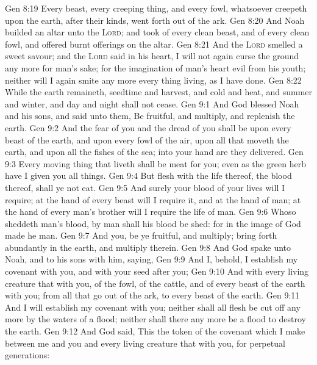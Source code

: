 \vs Gen 8:19 Every beast, every creeping thing, and every fowl,  whatsoever creepeth upon the earth, after their kinds, went forth out of the ark.
\vs Gen 8:20 And Noah builded an altar unto the \textsc{Lord}; and took of every clean beast, and of every clean fowl, and offered burnt offerings on the altar.
\vs Gen 8:21 And the \textsc{Lord} smelled a sweet savour; and the \textsc{Lord} said in his heart, I will not again curse the ground any more for man's sake; for the imagination of man's heart  evil from his youth; neither will I again smite any more every thing living, as I have done.
\vs Gen 8:22 While the earth remaineth, seedtime and harvest, and cold and heat, and summer and winter, and day and night shall not cease.
\vs Gen 9:1 And God blessed Noah and his sons, and said unto them, Be fruitful, and multiply, and replenish the earth.
\vs Gen 9:2 And the fear of you and the dread of you shall be upon every beast of the earth, and upon every fowl of the air, upon all that moveth  the earth, and upon all the fishes of the sea; into your hand are they delivered.
\vs Gen 9:3 Every moving thing that liveth shall be meat for you; even as the green herb have I given you all things.
\vs Gen 9:4 But flesh with the life thereof,  the blood thereof, shall ye not eat.
\vs Gen 9:5 And surely your blood of your lives will I require; at the hand of every beast will I require it, and at the hand of man; at the hand of every man's brother will I require the life of man.
\vs Gen 9:6 Whoso sheddeth man's blood, by man shall his blood be shed: for in the image of God made he man.
\vs Gen 9:7 And you, be ye fruitful, and multiply; bring forth abundantly in the earth, and multiply therein.
\vs Gen 9:8 And God spake unto Noah, and to his sons with him, saying,
\vs Gen 9:9 And I, behold, I establish my covenant with you, and with your seed after you;
\vs Gen 9:10 And with every living creature that  with you, of the fowl, of the cattle, and of every beast of the earth with you; from all that go out of the ark, to every beast of the earth.
\vs Gen 9:11 And I will establish my covenant with you; neither shall all flesh be cut off any more by the waters of a flood; neither shall there any more be a flood to destroy the earth.
\vs Gen 9:12 And God said, This  the token of the covenant which I make between me and you and every living creature that  with you, for perpetual generations:

